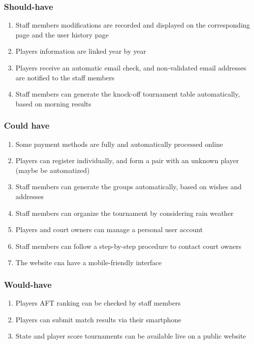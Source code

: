 \subsubsection{Should-have}

\begin{enumerate}
    \item Staff members modifications are recorded and displayed on the
        corresponding page and the user history page
    \item Players information are linked year by year
    \item Players receive an automatic email check, and non-validated
        email addresses are notified to the staff members
    \item Staff members can generate the knock-off tournament table
        automatically, based on morning results
\end{enumerate}

\subsubsection{Could have}

\begin{enumerate}
    \item Some payment methods are fully and automatically processed
        online
    \item Players can register individually, and form a pair with an
        unknown player (maybe be automatized)
    \item Staff members can generate the groups automatically, based on
        wishes and addresses
    \item Staff members can organize the tournament by considering rain
        weather
    \item Players and court owners can manage a personal user
        account
    \item Staff members can follow a step-by-step procedure to contact
        court owners
    \item The website cna have a mobile-friendly interface
\end{enumerate}

\subsubsection{Would-have}

\begin{enumerate}
    \item Players AFT ranking can be checked by staff members
    \item Players can submit match results via their smartphone
    \item State and player score tournaments can be available live on a
        public website
\end{enumerate}


